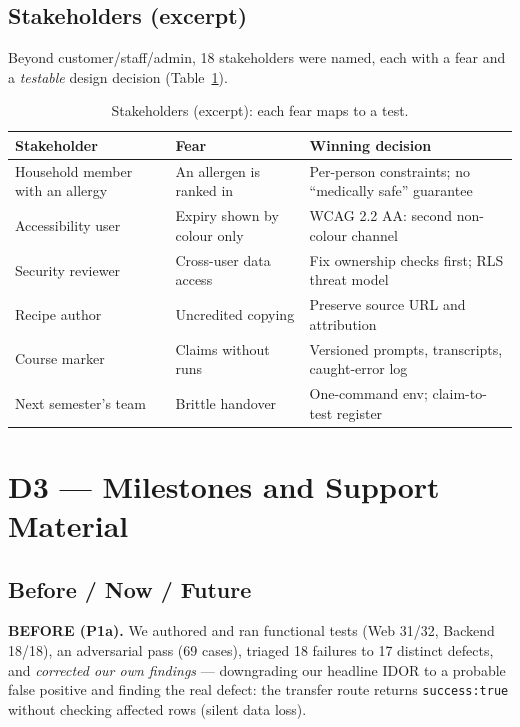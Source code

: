 \documentclass[sigconf,nonacm]{acmart}
\begin{document}
\subsection{Stakeholders (excerpt)}
Beyond customer/staff/admin, 18 stakeholders were named, each with a fear and a
\emph{testable} design decision (Table~\ref{tab:stake}).

\begin{table}[h]\footnotesize\centering\caption{Stakeholders (excerpt): each fear maps to a test.}\label{tab:stake}
\begin{tabular}{@{}p{2.1cm}p{2.4cm}p{2.9cm}@{}}
\toprule
\textbf{Stakeholder} & \textbf{Fear} & \textbf{Winning decision} \\
\midrule
Household member with an allergy & An allergen is ranked in & Per-person constraints; no ``medically safe'' guarantee \\
Accessibility user & Expiry shown by colour only & WCAG 2.2 AA: second non-colour channel \cite{wcag22} \\
Security reviewer & Cross-user data access & Fix ownership checks first; RLS threat model \cite{asvs,supabaserls} \\
Recipe author & Uncredited copying & Preserve source URL and attribution \\
Course marker & Claims without runs & Versioned prompts, transcripts, caught-error log \\
Next semester's team & Brittle handover & One-command env; claim-to-test register \\
\bottomrule
\end{tabular}
\end{table}

\section{D3 --- Milestones and Support Material}
\subsection{Before / Now / Future}
\textbf{BEFORE (P1a).} We authored and ran functional tests (Web 31/32, Backend
18/18), an adversarial pass (69 cases), triaged 18 failures to 17 distinct
defects, and \emph{corrected our own findings} --- downgrading our headline IDOR to
a probable false positive and finding the real defect: the transfer route returns
\texttt{success:true} without checking affected rows (silent data loss).
\end{document}
